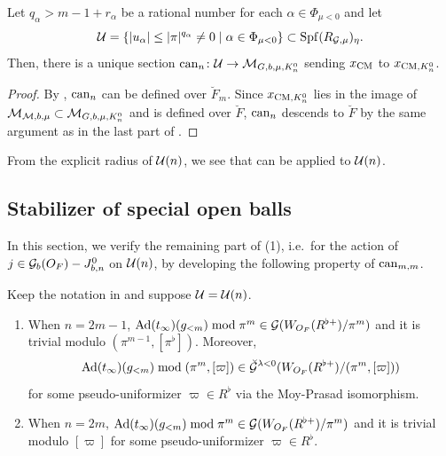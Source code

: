 \documentclass[12pt,reqno]{amsart}
\begin{document}
\begin{cor} \label{cor:canonical_CM_structure}
    Let $q_\alpha > m - 1 + r_\alpha$ be a rational number for each $\alpha \in \Phi_{\mu < 0}$ and let 
    \[
        {\mathcal{U}} = \{ \lvert u_\alpha \rvert \leq \lvert \pi \rvert^{q_\alpha} \neq 0 \mid\alpha \in \Phi_{\mu<0} \} \subset {\operatorname{Spf}}(R_{{\mathcal{G}},\mu})_\eta. 
    \]
    Then, there is a unique section
    $
        {\operatorname{can}}_n\colon {\mathcal{U}}\to {\mathcal{M}}_{G, b, \mu, K_n^0}
    $
    sending $x_{\operatorname{CM}}$ to $x_{{\operatorname{CM}}, K_n^0}$. 
\end{cor}
\begin{proof}
    By , ${\operatorname{can}}_n$ can be defined over $\breve{F}_m$. Since $x_{{\operatorname{CM}}, K_n^0}$ lies in the image of ${\mathcal{M}}_{{\mathcal{M}}, b, \mu} \subset {\mathcal{M}}_{G, b, \mu, K_n^0}$ and is defined over $\breve{F}$, ${\operatorname{can}}_n$ descends to $\breve{F}$ by the same argument as in the last part of . 
\end{proof}

From the explicit radius of ${\mathcal{U}}(n)$, we see that  can be applied to ${\mathcal{U}}(n)$. 


\subsection{Stabilizer of special open balls}

In this section, we verify the remaining part of  (1), i.e.\ for the action of $j \in {\mathcal{G}}_b(O_F) - J_{b, n}^0$ on ${\mathcal{U}}(n)$, by developing the following property of ${\operatorname{can}}_{m, m}$. %

\begin{lem} \label{lem:Adjoint_of_g<m}
    Keep the notation in  and suppose ${\mathcal{U}} = {\mathcal{U}}(n)$. 
    \begin{enumerate}
        \item When $n = 2m - 1$, ${\operatorname{Ad}}(t_\infty)(g_{<m}) \bmod \pi^m \in {\mathcal{G}}(W_{O_F}(R^{\flat+})/\pi^{m})$ and it is trivial modulo $(\pi^{m-1}, [\pi^{\flat}])$. Moreover, 
        \[
            {\operatorname{Ad}}(t_\infty)(g_{<m}) \bmod{(\pi^m, [\varpi])} \in \breve{{\mathcal{G}}}^{\lambda < 0}(W_{O_F}(R^{\flat+})/(\pi^m, [\varpi]))
        \]
        for some pseudo-uniformizer $\varpi \in R^\flat$ via the Moy-Prasad isomorphism. 
        \item When $n = 2m$, ${\operatorname{Ad}}(t_\infty)(g_{<m}) \bmod \pi^m \in {\mathcal{G}}(W_{O_F}(R^{\flat+})/\pi^{m})$ and it is trivial modulo $[\varpi]$ for some pseudo-uniformizer $\varpi \in R^\flat$. 
    \end{enumerate}
\end{lem}
\end{document}
